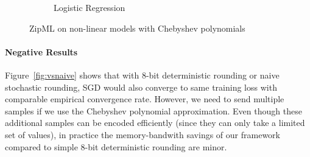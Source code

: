 \documentclass{article}
\begin{document}
\begin{figure}[h]
\begin{subfigure}[h]{.4\columnwidth}
    \caption{Logistic Regression}
    \end{subfigure}
\caption{ZipML on non-linear models with Chebyshev polynomials}
\label{fig:chebyshev}
\end{figure}

\paragraph{Negative Results}
Figure~\ref{fig:vsnaive} shows that with 8-bit deterministic rounding or naive
stochastic rounding, SGD would also converge to same training loss with comparable
empirical convergence rate. However, we need to send multiple samples if we use the Chebyshev polynomial approximation. 
Even though these additional samples can be encoded efficiently (since they can only take a limited set of values), 
in practice the memory-bandwith savings of our framework
compared to simple 8-bit deterministic rounding are minor. 
\
\end{document}
